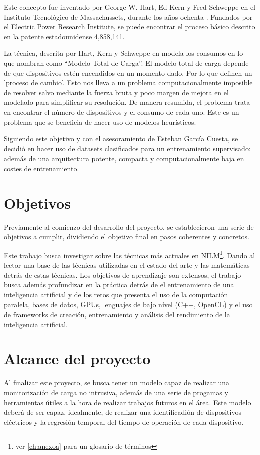 Este concepto fue inventado por George W. Hart, Ed Kern y Fred Schweppe en el Instituto Tecnológico de Massachussets, durante los años ochenta \autocite{192069}. Fundados por el Electric Power Research Institute, se puede encontrar el proceso básico descrito en la patente estadounidense 4,858,141.

La técnica, descrita por Hart, Kern y Schweppe en \autocite{192069} modela los consumos en lo que nombran como \enquote{Modelo Total de Carga}. El modelo total de carga depende de que dispositivos estén encendidos en un momento dado. Por lo que definen un 'proceso de cambio'.
Esto nos lleva a un problema computacionalmente imposible de resolver salvo mediante la fuerza bruta\autocite[4]{192069} y poco margen de mejora en el modelado para simplificar su resolución. De manera resumida, el problema trata en encontrar el número de dispositivos y el consumo de cada uno. 
Este es un problema que se beneficia de hacer uso de modelos heurísticos.

Siguiendo este objetivo y con el asesoramiento de Esteban García Cuesta, se decidió en hacer uso de datasets clasificados para un entrenamiento supervisado; además de una arquitectura potente, compacta y computacionalmente baja en costes de entrenamiento. 




\section{Objetivos}
\label{sec:objetivos}
Previamente al comienzo del desarrollo del proyecto, se establecieron una serie de objetivos a cumplir, dividiendo el objetivo final en pasos coherentes y concretos.

Este trabajo busca investigar sobre las técnicas más actuales en NILM\footnote{ver \autoref{ch:anexoa} para un glosario de términos}. Dando al lector una base de las técnicas utilizadas en el estado del arte y las matemáticas detrás de estas técnicas.
Los objetivos de aprendizaje son extensos, el trabajo busca además profundizar en la práctica detrás de el entrenamiento de una inteligencia artificial y de los retos que presenta el uso de la computación paralela, bases de datos, GPUs, lenguajes de bajo nivel (C++, OpenCL) y el uso de frameworks de creación, entrenamiento y análisis del rendimiento de la inteligencia artificial.


\section{Alcance del proyecto}
\label{sec:alcanceproyecto}
Al finalizar este proyecto, se busca tener un modelo capaz de realizar una monitorización de carga no intrusiva, además de una serie de progamas y herramientas útiles a la hora de realizar trabajos futuros en el área.
Este modelo deberá de ser capaz, idealmente, de realizar una identificadión de dispositivos eléctricos y la regresión temporal del tiempo de operación de cada dispositivo.

